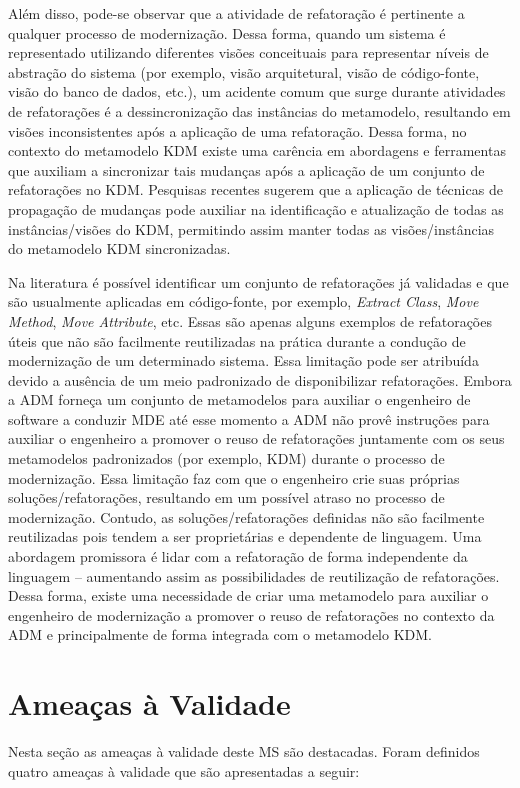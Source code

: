 Além disso, pode-se observar que a atividade de refatoração é pertinente a qualquer processo de modernização. Dessa forma, quando um sistema é representado utilizando diferentes visões conceituais para representar níveis de abstração do sistema (por exemplo, visão arquitetural, visão de código-fonte, visão do banco de dados, etc.), um acidente comum que surge durante atividades de refatorações é a dessincronização das instâncias do metamodelo, resultando em visões inconsistentes após a aplicação de uma refatoração. Dessa forma, no contexto do metamodelo KDM existe uma carência em abordagens e ferramentas que auxiliam a sincronizar tais mudanças após a aplicação de um conjunto de refatorações no KDM. Pesquisas recentes sugerem que a aplicação de técnicas de propagação de mudanças pode auxiliar na identificação e atualização de todas as instâncias/visões do KDM, permitindo assim manter todas as visões/instâncias do metamodelo KDM sincronizadas. 

Na literatura é possível identificar um conjunto de refatorações já validadas e que são usualmente aplicadas em código-fonte, por exemplo, \textit{Extract Class}, \textit{Move Method}, \textit{Move Attribute}, etc. Essas são apenas alguns exemplos de refatorações úteis que não são facilmente reutilizadas na prática durante a condução de modernização de um determinado sistema. Essa limitação pode ser atribuída devido a ausência de um meio padronizado de disponibilizar refatorações. Embora a ADM forneça um conjunto de metamodelos para auxiliar o engenheiro de software a conduzir MDE até esse momento a ADM não provê instruções para auxiliar o engenheiro a promover o reuso de refatorações juntamente com os seus metamodelos padronizados (por exemplo, KDM) durante o processo de modernização. Essa limitação faz com que o engenheiro crie suas próprias soluções/refatorações, resultando em um possível atraso no processo de modernização. Contudo, as soluções/refatorações  definidas não são facilmente reutilizadas pois tendem a ser proprietárias e dependente de linguagem. Uma abordagem promissora é lidar com a refatoração de forma independente da linguagem – aumentando assim as possibilidades de reutilização de refatorações. Dessa forma, existe uma necessidade de criar uma metamodelo para auxiliar o engenheiro de modernização a promover o reuso de refatorações no contexto da ADM e principalmente de forma integrada com o metamodelo KDM. 

\section{Ameaças à Validade}
Nesta seção as ameaças à validade deste MS são destacadas. Foram definidos quatro ameaças à validade que são apresentadas a seguir:

